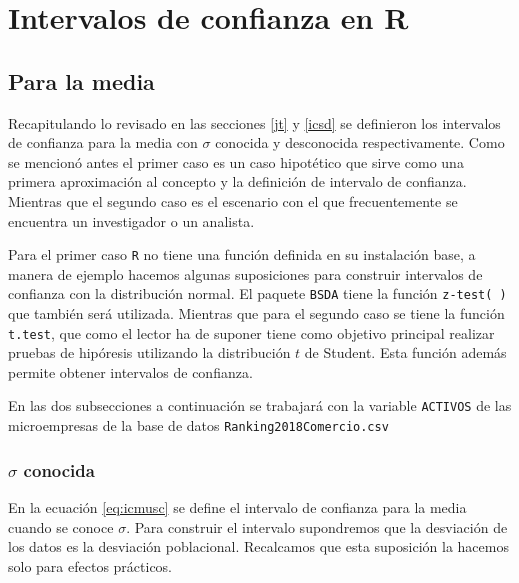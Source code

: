 \documentclass[
]{krantz}
\begin{document}
\newpage

\hypertarget{intervalos-de-confianza-en-r}{%
\section{Intervalos de confianza en R}\label{intervalos-de-confianza-en-r}}

\hypertarget{para-la-media}{%
\subsection{Para la media}\label{para-la-media}}

Recapitulando lo revisado en las secciones \ref{jt} y \ref{icsd} se definieron los intervalos de confianza para la media con \(\sigma\) conocida y desconocida respectivamente. Como se mencionó antes el primer caso es un caso hipotético que sirve como una primera aproximación al concepto y la definición de intervalo de confianza. Mientras que el segundo caso es el escenario con el que frecuentemente se encuentra un investigador o un analista.

Para el primer caso \texttt{R} no tiene una función definida en su instalación base, a manera de ejemplo hacemos algunas suposiciones para construir intervalos de confianza con la distribución normal. El paquete \texttt{BSDA} tiene la función \texttt{z-test(\ )} que también será utilizada. Mientras que para el segundo caso se tiene la función \texttt{t.test}, que como el lector ha de suponer tiene como objetivo principal realizar pruebas de hipóresis utilizando la distribución \(t\) de Student. Esta función además permite obtener intervalos de confianza.

En las dos subsecciones a continuación se trabajará con la variable \texttt{ACTIVOS} de las microempresas de la base de datos \texttt{Ranking2018Comercio.csv}

\hypertarget{musc}{%
\subsubsection{\texorpdfstring{\(\sigma\) conocida}{\textbackslash{}sigma conocida}}\label{musc}}

En la ecuación \eqref{eq:icmusc} se define el intervalo de confianza para la media cuando se conoce \(\sigma\). Para construir el intervalo supondremos que la desviación de los datos es la desviación poblacional. Recalcamos que esta suposición la hacemos solo para efectos prácticos.
\end{document}
